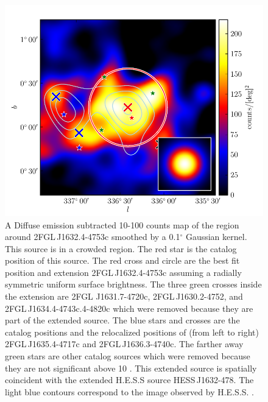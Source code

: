 \documentclass[12pt,preprint]{aastex}
\newcommand{\gev}{\text{GeV}\xspace}
\newcommand{\tev}{\text{TeV}\xspace}
\renewcommand{\deg}{\ensuremath{^\circ}\xspace}
\begin{document}
\begin{figure}
  \begin{center}
    \includegraphics[type=pdf,ext=.pdf,read=.pdf]{source_plots/source_1FGL_J1632.9-4802c}
  \end{center}
  \caption{A Diffuse emission subtracted 10-100
  \gev counts map of the region around 2FGL\,J1632.4-4753c smoothed by
  a 0.1\deg Gaussian kernel.  This source is in a crowded region.
  The red star is the catalog position of this source.  The red
  cross and circle are the best fit position and extension 2FGL\,J1632.4-4753c 
  assuming a radially
  symmetric uniform surface brightness.
  The three
  green crosses inside the extension are 2FGL
  J1631.7-4720c, 2FGL\,J1630.2-4752, and 2FGL\,J1634.4-4743c.4-4820c
  which were removed because they are part
  of the extended source.  The blue stars and crosses are the catalog
  positions and the relocalized positions of (from left to right)
  2FGL\,J1635.4-4717c and 2FGL\,J1636.3-4740c.  The farther away green
  stars are other catalog sources which were removed because they are
  not significant above 10 \gev.  This extended source is spatially
  coincident with the extended H.E.S.S source HESS\,J1632-478.
  The light blue contours correspond to the \tev image observed by H.E.S.S.
  \citep{hess_plane_survey}.
  }\label{1FGL_J1632.9-4802c}
\end{figure}
\end{document}
